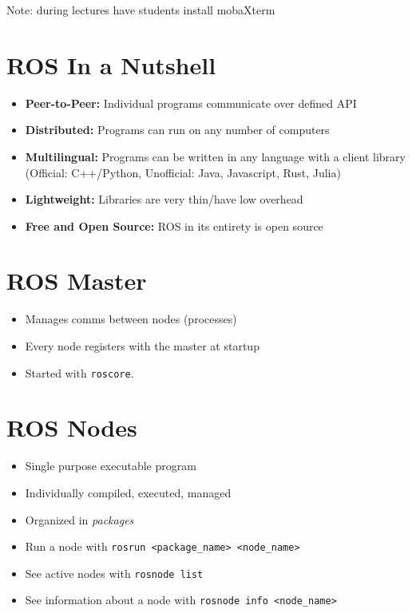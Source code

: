 \documentclass{article}
\begin{document}
Note: during lectures have students install mobaXterm
\section{ROS In a Nutshell}
\begin{itemize}
    \item \textbf{Peer-to-Peer:} \quad Individual programs communicate over defined API
    \item \textbf{Distributed:} \quad Programs can run on any number of computers
    \item \textbf{Multilingual:} \quad Programs can be written in any language with a client library (Official: C++/Python, Unofficial: Java, Javascript, Rust, Julia)
    \item \textbf{Lightweight:} \quad Libraries are very thin/have low overhead
    \item \textbf{Free and Open Source:} \quad ROS in its entirety is open source
\end{itemize}
\section{ROS Master}
\begin{itemize}
    \item Manages comms between nodes (processes)
    \item Every node registers with the master at startup
    \item Started with \lstinline{roscore}.
\end{itemize}
\section{ROS Nodes}
\begin{itemize}
    \item Single purpose executable program
    \item Individually compiled, executed, managed
    \item Organized in \textit{packages}
    \item Run a node with \lstinline{rosrun <package_name> <node_name>}
    \item See active nodes with \lstinline{rosnode list}
    \item See information about a node with \lstinline{rosnode info <node_name>}
\end{itemize}
\end{document}
